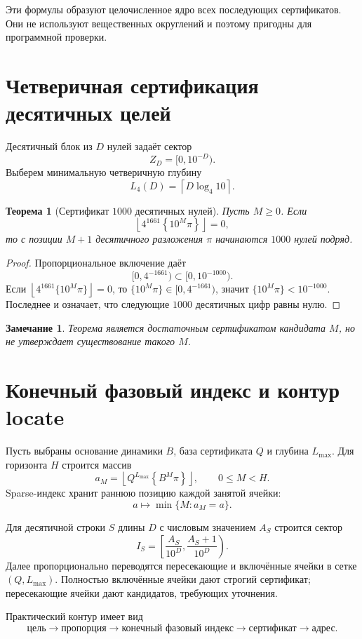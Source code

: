 \documentclass[11pt,a4paper]{article}
\newtheorem{theorem}{Теорема}
\newtheorem{remark}{Замечание}
\newcommand{\fracpart}[1]{\left\{#1\right\}}
\newcommand{\floor}[1]{\left\lfloor #1 \right\rfloor}
\begin{document}
Эти формулы образуют целочисленное ядро всех последующих сертификатов.  Они не используют вещественных округлений и поэтому пригодны для программной проверки.

\section{Четверичная сертификация десятичных целей}

Десятичный блок из $D$ нулей задаёт сектор
\[
  Z_D=[0,10^{-D}).
\]
Выберем минимальную четверичную глубину
\[
  L_4(D)=\left\lceil D\log_4 10\right\rceil.
\]

\begin{theorem}[Сертификат $1000$ десятичных нулей]
Пусть $M\ge0$.  Если
\[
  \floor{4^{1661}\fracpart{10^M\pi}}=0,
\]
то с позиции $M+1$ десятичного разложения $\pi$ начинаются $1000$ нулей подряд.
\end{theorem}

\begin{proof}
Пропорциональное включение даёт
\[
  [0,4^{-1661})\subset[0,10^{-1000}).
\]
Если $\floor{4^{1661}\{10^M\pi\}}=0$, то $\{10^M\pi\}\in[0,4^{-1661})$, значит $\{10^M\pi\}<10^{-1000}$. Последнее и означает, что следующие $1000$ десятичных цифр равны нулю.
\end{proof}

\begin{remark}
Теорема является достаточным сертификатом кандидата $M$, но не утверждает существование такого $M$.
\end{remark}

\section{Конечный фазовый индекс и контур locate}

Пусть выбраны основание динамики $B$, база сертификата $Q$ и глубина $L_{\max}$.  Для горизонта $H$ строится массив
\[
  a_M=\floor{Q^{L_{\max}}\fracpart{B^M\pi}},\qquad 0\le M<H.
\]
Sparse-индекс хранит раннюю позицию каждой занятой ячейки:
\[
  a\mapsto \min\{M:a_M=a\}.
\]

Для десятичной строки $S$ длины $D$ с числовым значением $A_S$ строится сектор
\[
  I_S=\left[\frac{A_S}{10^D},\frac{A_S+1}{10^D}\right).
\]
Далее пропорционально переводятся пересекающие и включённые ячейки в сетке $(Q,L_{\max})$.  Полностью включённые ячейки дают строгий сертификат; пересекающие ячейки дают кандидатов, требующих уточнения.

Практический контур имеет вид
\[
  \text{цель}\to\text{пропорция}\to\text{конечный фазовый индекс}\to\text{сертификат}\to\text{адрес}.
\]
\end{document}
